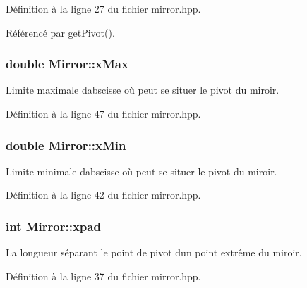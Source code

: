 Définition à la ligne 27 du fichier mirror.\+hpp.



Référencé par get\+Pivot().

\hypertarget{classMirror_ab0e8322594aeb39432b4696d67e3ba6d}{}
\subsubsection[{x\+Max}]{\setlength{\rightskip}{0pt plus 5cm}double Mirror\+::x\+Max\hspace{0.3cm}{\ttfamily [private]}}\label{classMirror_ab0e8322594aeb39432b4696d67e3ba6d}


Limite maximale d\textquotesingle{}abscisse où peut se situer le pivot du miroir. 



Définition à la ligne 47 du fichier mirror.\+hpp.

\hypertarget{classMirror_a797115030b6a7bded6bab18a080e30c6}{}
\subsubsection[{x\+Min}]{\setlength{\rightskip}{0pt plus 5cm}double Mirror\+::x\+Min\hspace{0.3cm}{\ttfamily [private]}}\label{classMirror_a797115030b6a7bded6bab18a080e30c6}


Limite minimale d\textquotesingle{}abscisse où peut se situer le pivot du miroir. 



Définition à la ligne 42 du fichier mirror.\+hpp.

\hypertarget{classMirror_aef41f122c76a825af7d12eaddf6ff1ea}{}
\subsubsection[{xpad}]{\setlength{\rightskip}{0pt plus 5cm}int Mirror\+::xpad\hspace{0.3cm}{\ttfamily [private]}}\label{classMirror_aef41f122c76a825af7d12eaddf6ff1ea}


La longueur séparant le point de pivot d\textquotesingle{}un point extrême du miroir. 



Définition à la ligne 37 du fichier mirror.\+hpp.



